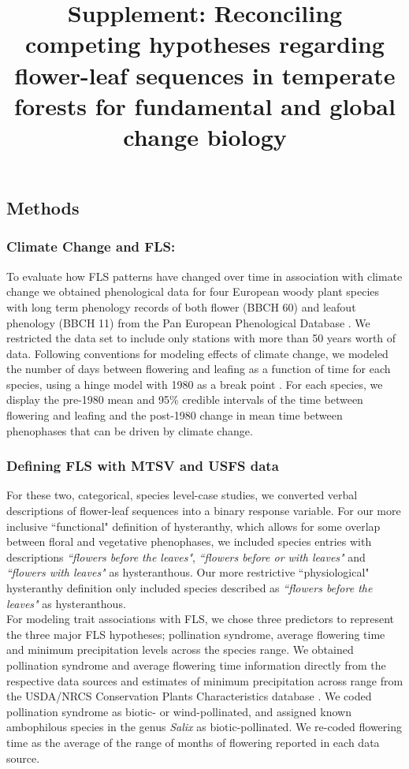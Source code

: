 \documentclass{article}\usepackage[]{graphicx}\usepackage[]{color}
\title{Supplement: Reconciling competing hypotheses regarding flower-leaf sequences in temperate forests for fundamental and global change biology}
\begin{document}
\maketitle

\subsection*{Methods}
\subsubsection*{Climate Change and FLS:}
To evaluate how FLS patterns have changed over time in association with climate change we obtained phenological data for four European woody plant species with long term phenology records of both flower (BBCH 60) and leafout phenology (BBCH 11) from the Pan European Phenological Database \citep{PEP725}. We restricted the data set to include only stations with more than 50 years worth of data. Following conventions for modeling effects of climate change, we modeled the number of days between flowering and leafing as a function of time for each species, using a hinge model with 1980 as a break point \citep{IPCC2013,Kharouba2018}. For each species, we display the pre-1980 mean and 95\% credible intervals of the time between flowering and leafing and the post-1980 change in mean time between phenophases that can be driven by climate change.

\subsubsection*{Defining FLS with MTSV and USFS data}
For these two, categorical, species level-case studies, we converted verbal descriptions of flower-leaf sequences into a binary response variable. For our more inclusive ``functional" definition of hysteranthy, which allows for some overlap between floral and vegetative phenophases, we included species entries with descriptions \textit{``flowers before the leaves"}, \textit{``flowers before or with leaves"} and \textit{``flowers with leaves"} as hysteranthous. Our more restrictive ``physiological" hysteranthy definition only included species described as \textit{``flowers before the leaves"} as hysteranthous.\\

\noindent For modeling trait associations with FLS, we chose three predictors to represent the three major FLS hypotheses; pollination syndrome, average flowering time and minimum precipitation levels across the species range. We obtained pollination syndrome and average flowering time information directly from the respective data sources and estimates of minimum precipitation across range from the USDA/NRCS Conservation Plants Characteristics database \citep{NRCS}. We coded pollination syndrome as biotic- or wind-pollinated, and assigned known ambophilous species in the genus \textit{Salix} as biotic-pollinated. We re-coded flowering time as the average of the range of months of flowering reported in each data source.\\
\end{document}
